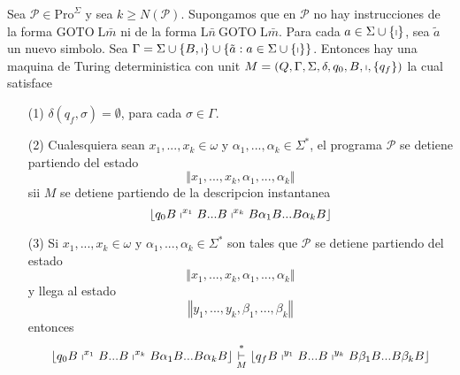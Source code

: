 \begin{frame}
  \begin{lemma}
  \label{simulacion}Sea $\mathcal{P}\in \mathrm{Pro}^{\Sigma }$ y sea $k\geq N(%
  \mathcal{P})$. Supongamos que en $\mathcal{P}$ no hay instrucciones de la
  forma $\mathrm{GOTO}\;\mathrm{L}\bar{m}$ ni de la forma $\mathrm{L}\bar{n}\
  \mathrm{GOTO}\;\mathrm{L}\bar{m}$. Para cada $a\in \Sigma \cup \{\shortmid \}
  $, sea $\tilde{a}$ un nuevo simbolo. Sea $\Gamma =\Sigma \cup \{B,\shortmid
  \}\cup \{\tilde{a}:a\in \Sigma \cup \{\shortmid \}\}$. Entonces hay una
  maquina de Turing deterministica con unit $M=\left( Q,\Gamma ,\Sigma ,\delta
  ,q_{0},B,\shortmid ,\{q_{f}\}\right) $ la cual satisface

  \begin{enumerate}
  \item[(1)] $\delta (q_{f},\sigma )=\emptyset $, para cada $\sigma \in \Gamma
  $.

  \item[(2)] Cualesquiera sean $x_{1},...,x_{k}\in \omega $ y $\alpha
  _{1},...,\alpha _{k}\in \Sigma ^{\ast }$, el programa $\mathcal{P}$ se
  detiene partiendo del estado%
  \begin{equation*}
  \left\Vert x_{1},...,x_{k},\alpha _{1},...,\alpha _{k}\right\Vert
  \end{equation*}%
  sii $M$ se detiene partiendo de la descripcion instantanea%
  \begin{equation*}
  \left\lfloor q_{0}B\shortmid ^{x_{1}}B...B\shortmid ^{x_{k}}B\alpha
  _{1}B...B\alpha _{k}B\right\rfloor
  \end{equation*}

  \item[(3)] Si $x_{1},...,x_{k}\in \omega $ y $\alpha _{1},...,\alpha _{k}\in
  \Sigma ^{\ast }$ son tales que $\mathcal{P}$ se detiene partiendo del estado%
  \begin{equation*}
  \left\Vert x_{1},...,x_{k},\alpha _{1},...,\alpha _{k}\right\Vert
  \end{equation*}%
  y llega al estado%
  \begin{equation*}
  \left\Vert y_{1},...,y_{k},\beta _{1},...,\beta _{k}\right\Vert
  \end{equation*}%
  entonces%
  \begin{equation*}
  \left\lfloor q_{0}B\shortmid ^{x_{1}}B...B\shortmid ^{x_{k}}B\alpha
  _{1}B...B\alpha _{k}B\right\rfloor \overset{\ast }{\underset{M}{\vdash }}%
  \left\lfloor q_{f}B\shortmid ^{y_{1}}B...B\shortmid ^{y_{k}}B\beta
  _{1}B...B\beta _{k}B\right\rfloor
  \end{equation*}
  \end{enumerate}
  \end{lemma}
\end{frame}
